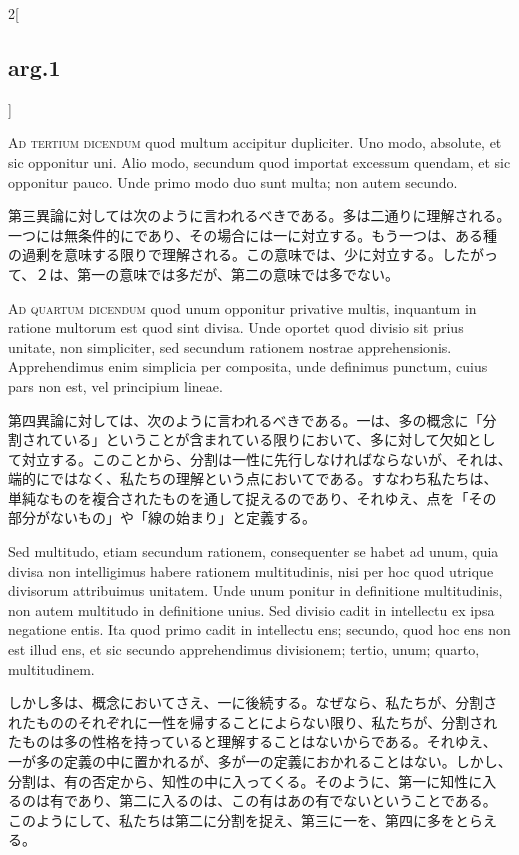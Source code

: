 \documentclass[paper=a4paper,fontsize=10pt,jafontsize=9pt,titlepage]{jlreq}
\begin{document}
\begin{paracol}{2}[\subsection{arg.1}]
\switchcolumn*[\subsection{ad.3}]

{\scshape Ad tertium dicendum} quod multum accipitur dupliciter. Uno modo,
absolute, et sic opponitur uni. Alio modo, secundum quod importat
excessum quendam, et sic opponitur pauco. Unde primo modo duo sunt
multa; non autem secundo.

\switchcolumn

第三異論に対しては次のように言われるべきである。多は二通りに理解される。
一つには無条件的にであり、その場合には一に対立する。もう一つは、ある種
の過剰を意味する限りで理解される。この意味では、少に対立する。したがっ
て、２は、第一の意味では多だが、第二の意味では多でない。

\switchcolumn*[\subsection{ad.4}]

{\scshape Ad quartum dicendum} quod unum opponitur privative multis,
inquantum in ratione multorum est quod sint divisa. Unde oportet quod
divisio sit prius unitate, non simpliciter, sed secundum rationem
nostrae apprehensionis. Apprehendimus enim simplicia per composita, unde
definimus punctum, cuius pars non est, vel principium lineae.

\switchcolumn

第四異論に対しては、次のように言われるべきである。一は、多の概念に「分
割されている」ということが含まれている限りにおいて、多に対して欠如とし
て対立する。このことから、分割は一性に先行しなければならないが、それは、
端的にではなく、私たちの理解という点においてである。すなわち私たちは、
単純なものを複合されたものを通して捉えるのであり、それゆえ、点を「その
部分がないもの」や「線の始まり」と定義する。

\switchcolumn*

Sed
multitudo, etiam secundum rationem, consequenter se habet ad unum, quia
divisa non intelligimus habere rationem multitudinis, nisi per hoc quod
utrique divisorum attribuimus unitatem. Unde unum ponitur in definitione
multitudinis, non autem multitudo in definitione unius. Sed divisio
cadit in intellectu ex ipsa negatione entis. Ita quod primo cadit in
intellectu ens; secundo, quod hoc ens non est illud ens, et sic secundo
apprehendimus divisionem; tertio, unum; quarto, multitudinem.

\switchcolumn

しかし多は、概念においてさえ、一に後続する。なぜなら、私たちが、分割さ
れたもののそれぞれに一性を帰することによらない限り、私たちが、分割され
たものは多の性格を持っていると理解することはないからである。それゆえ、
一が多の定義の中に置かれるが、多が一の定義におかれることはない。しかし、
分割は、有の否定から、知性の中に入ってくる。そのように、第一に知性に入
るのは有であり、第二に入るのは、この有はあの有でないということである。
このようにして、私たちは第二に分割を捉え、第三に一を、第四に多をとらえ
る。

\end{paracol}
\end{document}

